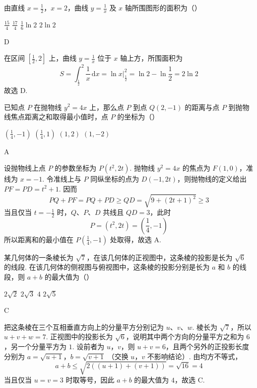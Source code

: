 \begin{problem}
由直线 \(x = \frac{1}{2}\)，\(x = 2\)，曲线 \(y = \frac{1}{x}\) 及 \(x\) 轴所围图形的面积为（\quad）

\choices
    {\(\frac{15}{4}\)}
    {\(\frac{17}{4}\)}
    {\(\frac{1}{6}\ln 2\)}
    {\(2 \ln 2\)}
\begin{answer}
D
\end{answer}

\begin{solution}
在区间 \(\left[\frac12,2\right]\) 上，曲线 \(y=\frac1x\) 位于 \(x\) 轴上方，所围面积为
\[
S=\int_{\frac{1}{2}}^{2}\frac{1}{x}\,\mathrm dx
=\left.\ln x\right|_{\frac{1}{2}}^{2}
=\ln2-\ln\frac12=2\ln2
\]
故选 D.
\end{solution}
\end{problem}

\begin{problem}
已知点 \(P\) 在抛物线 \(y^{2} = 4x\) 上，那么点 \(P\) 到点 \(Q(2, -1)\) 的距离与点 \(P\) 到抛物线焦点距离之和取得最小值时，点 \(P\) 的坐标为（\quad）

\choices
    {\(\left(\frac{1}{4}, -1\right)\)}
    {\(\left(\frac{1}{4}, 1\right)\)}
    {\((1,2)\)}
    {\((1,-2)\)}
\begin{answer}
A
\end{answer}

\begin{solution}
设抛物线上点 \(P\) 的参数坐标为 \(P\left(t^2,2t\right)\). 抛物线 \(y^2=4x\) 的焦点为 \(F\left(1,0\right)\)，准线为 \(x=-1\). 令准线上与 \(P\) 同纵坐标的点为 \(D\left(-1,2t\right)\)，则抛物线的定义给出 \(PF=PD=t^2+1\). 因而
\[
PQ+PF=PQ+PD\ge QD=\sqrt{9+\left(2t+1\right)^2}\ge3
\]
当且仅当 \(t=-\frac12\) 时，\(Q\)、\(P\)、\(D\) 共线且 \(QD=3\)，此时
\[
P=\left(t^2,2t\right)=\left(\frac14,-1\right)
\]
所以距离和的最小值在 \(P\left(\frac14,-1\right)\) 处取得，故选 A.
\end{solution}
\end{problem}

\begin{problem}
某几何体的一条棱长为 \(\sqrt{7}\)，在该几何体的正视图中，这条棱的投影是长为 \(\sqrt{6}\) 的线段. 在该几何体的侧视图与俯视图中，这条棱的投影分别是长为 \(a\) 和 \(b\) 的线段，则 \(a + b\) 的最大值为（\quad）

\choices
    {\(2\sqrt{2}\)}
    {\(2\sqrt{3}\)}
    {\(4\)}
    {\(2 \sqrt{5}\)}
\begin{answer}
C
\end{answer}

\begin{solution}
把这条棱在三个互相垂直方向上的分量平方分别记为 \(u\)、\(v\)、\(w\). 棱长为 \(\sqrt7\)，所以 \(u+v+w=7\). 正视图中的投影长为 \(\sqrt6\)，说明其中两个方向的分量平方之和为 \(6\)，另一个分量平方为 \(1\). 设前者为 \(u\)，\(v\)，则 \(u+v=6\)，且两个另外的正投影长度分别为
\(a=\sqrt{u+1}\)，\(b=\sqrt{v+1}\)
（交换 \(u\)，\(v\) 不影响结论）. 由均方不等式，
\[
a+b\le\sqrt{2\left(\left(u+1\right)+\left(v+1\right)\right)}
=\sqrt{16}=4
\]
当且仅当 \(u=v=3\) 时取等号，因此 \(a+b\) 的最大值为 \(4\)，故选 C.
\end{solution}
\end{problem}

